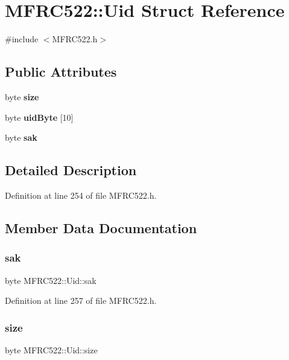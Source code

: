 \section{M\+F\+R\+C522\+:\+:Uid Struct Reference}
\label{struct_m_f_r_c522_1_1_uid}


{\ttfamily \#include $<$M\+F\+R\+C522.\+h$>$}

\subsection*{Public Attributes}
\begin{DoxyCompactItemize}
\item 
byte \textbf{ size}
\item 
byte \textbf{ uid\+Byte} [10]
\item 
byte \textbf{ sak}
\end{DoxyCompactItemize}


\subsection{Detailed Description}


Definition at line 254 of file M\+F\+R\+C522.\+h.



\subsection{Member Data Documentation}
\mbox{\label{struct_m_f_r_c522_1_1_uid_a90aa2fd57a03011252148c2ccdc8875b}} 
\subsubsection{sak}
{\footnotesize\ttfamily byte M\+F\+R\+C522\+::\+Uid\+::sak}



Definition at line 257 of file M\+F\+R\+C522.\+h.

\mbox{\label{struct_m_f_r_c522_1_1_uid_a49c06f93c7748abe00a9ab5899d479b7}} 
\subsubsection{size}
{\footnotesize\ttfamily byte M\+F\+R\+C522\+::\+Uid\+::size}




